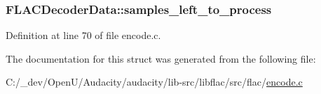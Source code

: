 \subsubsection[{\texorpdfstring{samples\+\_\+left\+\_\+to\+\_\+process}{samples_left_to_process}}]{ F\+L\+A\+C\+Decoder\+Data\+::samples\+\_\+left\+\_\+to\+\_\+process}\hypertarget{struct_f_l_a_c_decoder_data_ab0957e8c76146f3cac5a9f85cbfe6b80}{}\label{struct_f_l_a_c_decoder_data_ab0957e8c76146f3cac5a9f85cbfe6b80}


Definition at line 70 of file encode.\+c.



The documentation for this struct was generated from the following file\+:\begin{DoxyCompactItemize}
\item 
C\+:/\+\_\+dev/\+Open\+U/\+Audacity/audacity/lib-\/src/libflac/src/flac/\hyperlink{libflac_2src_2flac_2encode_8c}{encode.\+c}\end{DoxyCompactItemize}
